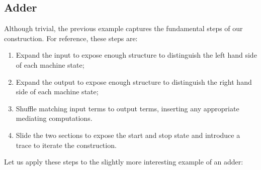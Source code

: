 \documentclass{llncs}
\begin{document}

\subsection{Adder} 


Although trivial, the previous example captures the fundamental steps of our
construction. For reference, these steps are:
\begin{enumerate}
\item Expand the input to expose enough structure to distinguish the left
  hand side of each machine state; 
\item Expand the output to expose enough structure to distinguish the right
  hand side of each machine state;
\item Shuffle matching input terms to output terms, inserting any appropriate
  mediating computations. 
\item Slide the two sections to expose the start and stop state and introduce
  a {{trace}} to iterate the construction.
\end{enumerate}

Let us apply these steps to the slightly more interesting example of an
adder:
\begin{multicols}{2}  

\end{multicols}
\end{document}
